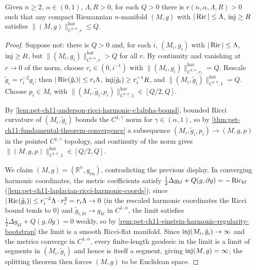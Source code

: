 \begin{theorem}
  \label{thm:pet-ch11-anderson-injectivity-radius-controls-norm}
  Given $n\ge2$, $\alpha\in(0,1)$, $\Lambda,R>0$, for each $Q>0$ there is
  $r(n,\alpha,\Lambda,R)>0$ such that any compact Riemannian $n$-manifold
  $(M,g)$ with $|\operatorname{Ric}|\le\Lambda$, $\operatorname{inj}\ge R$ satisfies
  $\|(M,g)\|^{\mathrm{har}}_{C^{1,\alpha},r}\le Q$.
\end{theorem}
\begin{proof}
  Suppose not: there is $Q>0$ and, for each $i$, $(M_i,g_i)$ with
  $|\operatorname{Ric}|\le\Lambda$, $\operatorname{inj}\ge R$, but
  $\|(M_i,g_i)\|^{\mathrm{har}}_{C^{1,\alpha},r}>Q$ for all $r$. By continuity
  and vanishing at $r\to0$ of the norm, choose $r_i\in(0,i^{-1})$ with
  $\|(M_i,g_i)\|^{\mathrm{har}}_{C^{1,\alpha},r_i}=Q$. Rescale
  $\tilde g_i=r_i^{-2}g_i$; then $|\operatorname{Ric}(\tilde g_i)|\le r_i\Lambda$,
  $\operatorname{inj}(\tilde g_i)\ge r_i^{-1}R$, and
  $\|(M_i,\tilde g_i)\|^{\mathrm{har}}_{C^{1,\alpha},1}=Q$. Choose
  $p_i\in M_i$ with $\|(M_i,\tilde g_i,p_i)\|^{\mathrm{har}}_{C^{1,\alpha},1}\in[Q/2,Q]$.

  By \cref{lem:pet-ch11-anderson-ricci-harmonic-c1alpha-bound}, bounded Ricci
  curvature of $(M_i,\tilde g_i)$ bounds the $C^{1,\gamma}$ norm for
  $\gamma\in(\alpha,1)$, so by
  \cref{thm:pet-ch11-fundamental-theorem-convergence} a subsequence
  $(M_i,\tilde g_i,p_i)\to(M,g,p)$ in the pointed $C^{1,\gamma}$ topology,
  and continuity of the norm gives
  $\|(M,g,p)\|^{\mathrm{har}}_{C^{1,\alpha},1}\in[Q/2,Q]$.

  We claim $(M,g)=(\mathbb{R}^n,g_{\mathrm{eu}})$, contradicting the previous
  display. In converging harmonic coordinates, the metric coefficients
  satisfy $\tfrac12\Delta g_{kl}+Q(g,\partial g)=-\operatorname{Ric}_{kl}$
  (\cref{lem:pet-ch11-laplacian-ricci-harmonic-coords}); since
  $|\operatorname{Ric}(\tilde g_i)|\le r_i^{-2}\Lambda\cdot r_i^2=r_i\Lambda\to0$ (in the
  rescaled harmonic coordinates the Ricci bound tends to $0$) and
  $\tilde g_{i,kl}\to g_{kl}$ in $C^{1,\alpha}$, the limit satisfies
  $\tfrac12\Delta g_{kl}+Q(g,\partial g)=0$ weakly, so by
  \cref{rem:pet-ch11-einstein-harmonic-regularity-bootstrap} the limit is a
  smooth Ricci-flat manifold. Since $\operatorname{inj}(M_i,\tilde g_i)\to\infty$ and the
  metrics converge in $C^{1,\alpha}$, every finite-length geodesic in the
  limit is a limit of segments in $(M_i,\tilde g_i)$ and hence is itself a
  segment, giving $\operatorname{inj}(M,g)=\infty$; the splitting theorem then forces
  $(M,g)$ to be Euclidean space.
\end{proof}

